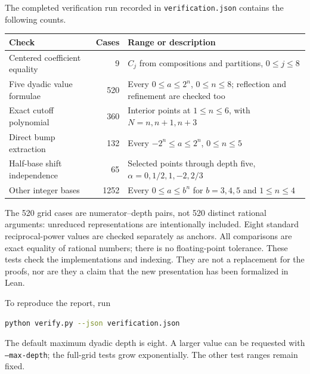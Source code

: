 \documentclass[11pt,oneside]{article}
\theoremstyle{definition}\newtheorem{definition}[theorem]{Definition}
\theoremstyle{remark}\newtheorem{remark}[theorem]{Remark}
\begin{document}
The completed verification run recorded in \texttt{verification.json}
contains the following counts.
\begin{center}
\small
\begin{tabularx}{\textwidth}{@{}l r X@{}}
\toprule
Check & Cases & Range or description\\
\midrule
Centered coefficient equality & 9 & $C_j$ from compositions and partitions,
$0\le j\le8$\\
Five dyadic value formulae & 520 & Every $0\le a\le2^n$, $0\le n\le8$;
reflection and refinement are checked too\\
Exact cutoff polynomial & 360 & Interior points at $1\le n\le6$,
with $N=n,n+1,n+3$\\
Direct bump extraction & 132 & Every $-2^n\le a\le2^n$, $0\le n\le5$\\
Half-base shift independence & 65 & Selected points through depth five,
$\alpha=0,1/2,1,-2,2/3$\\
Other integer bases & 1252 & Every $0\le a\le b^n$ for $b=3,4,5$ and
$1\le n\le4$\\
\bottomrule
\end{tabularx}
\end{center}
The 520 grid cases are numerator--depth pairs, not 520 distinct rational
arguments: unreduced representations are intentionally included.
Eight standard reciprocal-power values are checked separately as anchors.
All comparisons are exact equality of rational numbers; there is no
floating-point tolerance. These tests check the implementations and indexing.
They are not a replacement for the proofs, nor are they a claim that the new
presentation has been formalized in Lean.

To reproduce the report, run
\begin{lstlisting}[language=bash]
python verify.py --json verification.json
\end{lstlisting}
The default maximum dyadic depth is eight. A larger value can be requested
with \texttt{--max-depth}; the full-grid tests grow exponentially.
The other test ranges remain fixed.
\end{document}

